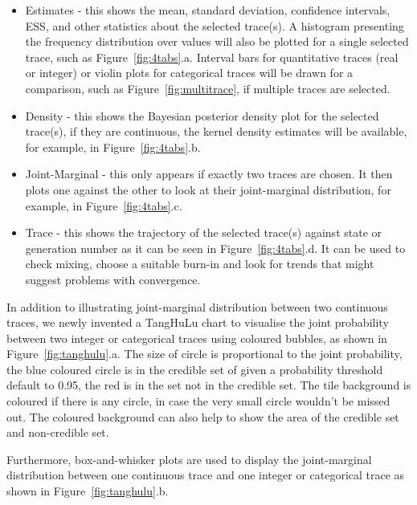 \documentclass{bioinfo}
\begin{document}
\begin{itemize}
\item Estimates - this shows the mean, standard deviation, confidence intervals, ESS, and other statistics about the selected trace(s). A histogram presenting the frequency distribution over values will also be plotted for a single selected trace, such as Figure~\ref{fig:4tabs}.a. Interval bars for quantitative traces (real or integer) or violin plots for categorical traces will be drawn for a comparison, such as Figure~\ref{fig:multitrace}, if multiple traces are selected.

\item Density - this shows the Bayesian posterior density plot for the selected trace(s), if they are continuous, the kernel density estimates will be available, for example, in Figure~\ref{fig:4tabs}.b.

\item Joint-Marginal - this only appears if exactly two traces are chosen. It then plots one against the other to look at their joint-marginal distribution, for example, in Figure~\ref{fig:4tabs}.c.

\item Trace - this shows the trajectory of the selected trace(s) against state or generation number as it can be seen in Figure~\ref{fig:4tabs}.d. It can be used to check mixing, choose a suitable burn-in and look for trends that might suggest problems with convergence.

\end{itemize}

In addition to illustrating joint-marginal distribution between two continuous traces, we newly invented a TangHuLu chart to visualise the joint probability between two integer or categorical traces using coloured bubbles, as shown in Figure~\ref{fig:tanghulu}.a. The size of circle is proportional to the joint probability, the blue coloured circle is in the credible set of given a probability threshold default to 0.95, the red is in the set not in the credible set. The tile background is coloured if there is any circle, in case the very small circle wouldn't be missed out. The coloured background can also help to show the area of the credible set and non-credible set.

Furthermore, box-and-whisker plots are used to display the joint-marginal distribution between one continuous trace and one integer or categorical trace as shown in Figure~\ref{fig:tanghulu}.b. 
\end{document}
